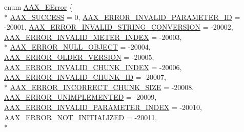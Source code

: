 \begin{DoxyCompactItemize}
\item 
enum \hyperlink{a00207_a5f8c7439f3a706c4f8315a9609811937}{A\+A\+X\+\_\+\+E\+Error} \{ \\*
\hyperlink{a00207_a5f8c7439f3a706c4f8315a9609811937aeddbd1bb67e3a66e6af54a4b4a7a57b3}{A\+A\+X\+\_\+\+S\+U\+C\+C\+E\+S\+S} = 0, 
\hyperlink{a00207_a5f8c7439f3a706c4f8315a9609811937a06161017c1b18c4300e0634502e35b78}{A\+A\+X\+\_\+\+E\+R\+R\+O\+R\+\_\+\+I\+N\+V\+A\+L\+I\+D\+\_\+\+P\+A\+R\+A\+M\+E\+T\+E\+R\+\_\+\+I\+D} = -\/20001, 
\hyperlink{a00207_a5f8c7439f3a706c4f8315a9609811937a831e5cfe0bb81df4776c0ef5c9fe1216}{A\+A\+X\+\_\+\+E\+R\+R\+O\+R\+\_\+\+I\+N\+V\+A\+L\+I\+D\+\_\+\+S\+T\+R\+I\+N\+G\+\_\+\+C\+O\+N\+V\+E\+R\+S\+I\+O\+N} = -\/20002, 
\hyperlink{a00207_a5f8c7439f3a706c4f8315a9609811937a7ecc7148bcbca18326dc947851f554ae}{A\+A\+X\+\_\+\+E\+R\+R\+O\+R\+\_\+\+I\+N\+V\+A\+L\+I\+D\+\_\+\+M\+E\+T\+E\+R\+\_\+\+I\+N\+D\+E\+X} = -\/20003, 
\\*
\hyperlink{a00207_a5f8c7439f3a706c4f8315a9609811937a647cce13fa531e3a46c6eab694048a9c}{A\+A\+X\+\_\+\+E\+R\+R\+O\+R\+\_\+\+N\+U\+L\+L\+\_\+\+O\+B\+J\+E\+C\+T} = -\/20004, 
\hyperlink{a00207_a5f8c7439f3a706c4f8315a9609811937a87ca13c4816a9a9f00b77231e3f6afb0}{A\+A\+X\+\_\+\+E\+R\+R\+O\+R\+\_\+\+O\+L\+D\+E\+R\+\_\+\+V\+E\+R\+S\+I\+O\+N} = -\/20005, 
\hyperlink{a00207_a5f8c7439f3a706c4f8315a9609811937ae43f3a83387f1f35e359c926cab93cda}{A\+A\+X\+\_\+\+E\+R\+R\+O\+R\+\_\+\+I\+N\+V\+A\+L\+I\+D\+\_\+\+C\+H\+U\+N\+K\+\_\+\+I\+N\+D\+E\+X} = -\/20006, 
\hyperlink{a00207_a5f8c7439f3a706c4f8315a9609811937a296182ef7ff5260f924a5882fdd3fda3}{A\+A\+X\+\_\+\+E\+R\+R\+O\+R\+\_\+\+I\+N\+V\+A\+L\+I\+D\+\_\+\+C\+H\+U\+N\+K\+\_\+\+I\+D} = -\/20007, 
\\*
\hyperlink{a00207_a5f8c7439f3a706c4f8315a9609811937a958476ec53e1f4a9c0b7000a15dbf18e}{A\+A\+X\+\_\+\+E\+R\+R\+O\+R\+\_\+\+I\+N\+C\+O\+R\+R\+E\+C\+T\+\_\+\+C\+H\+U\+N\+K\+\_\+\+S\+I\+Z\+E} = -\/20008, 
\hyperlink{a00207_a5f8c7439f3a706c4f8315a9609811937a3b76994b32b97fcd56b19ef8032245df}{A\+A\+X\+\_\+\+E\+R\+R\+O\+R\+\_\+\+U\+N\+I\+M\+P\+L\+E\+M\+E\+N\+T\+E\+D} = -\/20009, 
\hyperlink{a00207_a5f8c7439f3a706c4f8315a9609811937ace6e4acf25f270d58fc037bee565a653}{A\+A\+X\+\_\+\+E\+R\+R\+O\+R\+\_\+\+I\+N\+V\+A\+L\+I\+D\+\_\+\+P\+A\+R\+A\+M\+E\+T\+E\+R\+\_\+\+I\+N\+D\+E\+X} = -\/20010, 
\hyperlink{a00207_a5f8c7439f3a706c4f8315a9609811937af62bcf1ec44c99c6f602bd699de7c8f0}{A\+A\+X\+\_\+\+E\+R\+R\+O\+R\+\_\+\+N\+O\+T\+\_\+\+I\+N\+I\+T\+I\+A\+L\+I\+Z\+E\+D} = -\/20011, 
\\*

\end{DoxyCompactItemize}
